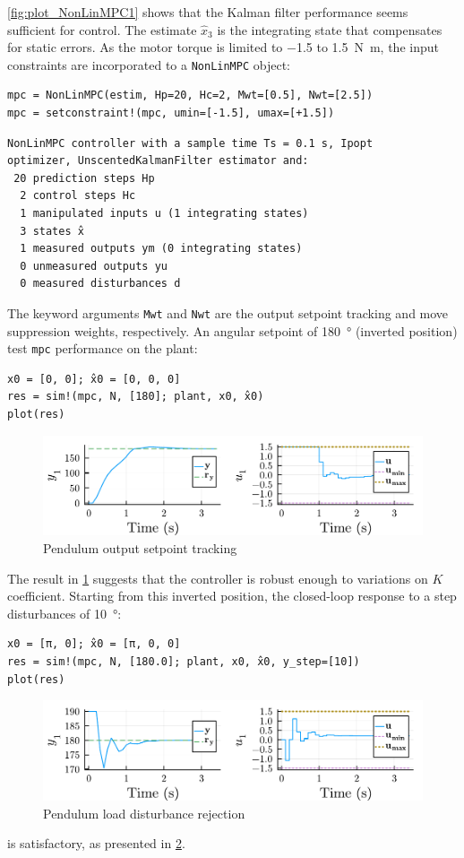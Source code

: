 \cref{fig:plot_NonLinMPC1} shows that the Kalman filter performance seems sufficient for control. The estimate $\hat{x}_3$ is the integrating state that compensates for static errors. As the motor torque is limited to \num{-1.5} to \SI{1.5}{\newton\meter}, the input constraints are incorporated to a \texttt{NonLinMPC} object:
\begin{verbatim}
mpc = NonLinMPC(estim, Hp=20, Hc=2, Mwt=[0.5], Nwt=[2.5])
mpc = setconstraint!(mpc, umin=[-1.5], umax=[+1.5])
\end{verbatim}
\spacerepl
\begin{verbatim}
NonLinMPC controller with a sample time Ts = 0.1 s, Ipopt
optimizer, UnscentedKalmanFilter estimator and:
 20 prediction steps Hp
  2 control steps Hc
  1 manipulated inputs u (1 integrating states)
  3 states x̂
  1 measured outputs ym (0 integrating states)
  0 unmeasured outputs yu
  0 measured disturbances d
\end{verbatim}

The keyword arguments \texttt{Mwt} and \texttt{Nwt} are the output setpoint tracking and move suppression weights, respectively. An angular setpoint of \SI{180}{\degree} (inverted position) test \texttt{mpc} performance on the plant: 

\begin{verbatim}
x0 = [0, 0]; x̂0 = [0, 0, 0]
res = sim!(mpc, N, [180]; plant, x0, x̂0)
plot(res)
\end{verbatim}

\begin{figure}[h]
    \centering
    \includegraphics[width=\columnwidth]{fig/plot_NonLinMPC2.pdf}
    \caption{Pendulum output setpoint tracking}
    \label{fig:plot_NonLinMPC2}
\end{figure}

The result in \cref{fig:plot_NonLinMPC2} suggests that the controller is robust enough to variations on $K$ coefficient. Starting from this inverted position, the closed-loop response to a step disturbances of \SI{10}{\degree}:

\begin{verbatim}
x0 = [π, 0]; x̂0 = [π, 0, 0]
res = sim!(mpc, N, [180.0]; plant, x0, x̂0, y_step=[10])
plot(res)
\end{verbatim}

\begin{figure}[h]
    \centering
    \includegraphics[width=\columnwidth]{fig/plot_NonLinMPC3.pdf}
    \caption{Pendulum load disturbance rejection}
    \label{fig:plot_NonLinMPC3}
\end{figure}

is satisfactory, as presented in \cref{fig:plot_NonLinMPC3}.

